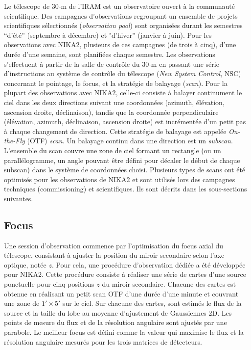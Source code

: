 Le télescope de 30-m de l'IRAM est un observatoire ouvert à la
communauté scientifique. Des campagnes d'observations regroupant un
ensemble de projets scientifiques sélectionnés (\emph{observation
  pool}) sont organisées durant les semestres ``d'été''
(septembre à décembre) et "d'hiver'' (janvier à juin). Pour les
observations avec NIKA2, plusieurs de ces campagnes (de trois à cinq),
d'une durée d'une semaine, sont planifiées chaque semestre. Les
observations s'effectuent à partir de la salle de contrôle du 30-m en
passant une série d'instructions au système de contrôle du télescope
(\emph{New System Control}, NSC) concernant le pointage, le focus, et
la stratégie de balayage (\emph{scan}).
Pour la plupart des observations avec NIKA2, celle-ci
consiste à balayer continument le ciel dans les deux directions
suivant une coordonnées (azimuth, élévation, ascension droite,
déclinaison), tandis que la coordonnée perpendiculaire (élévation, azimuth,
déclinaison, ascension droite) est incrémentée d'un petit pas à chaque
changement de direction. Cette stratégie de balayage est appelée
\emph{On-the-Fly} (OTF) \emph{scan}. Un balayage continu dans une
direction est un \emph{subscan}. L'ensemble du scan couvre une zone de
ciel formant un rectangle (ou un parallélogramme, un angle pouvant
être défini pour décaler le début de chaque subscan) dans le système
de coordonnées choisi. Plusieurs types de scans ont été optimisés pour les
observations de NIKA2 et sont utilisés lors des
campagnes techniques (commissioning) et scientifiques. Ils sont
décrits dans les sous-sections suivantes.

\subsection{Focus}
\label{se:focus}

Une session d'observation commence par l'optimisation du focus axial
du télescope, consistant à ajuster la position du miroir secondaire
selon l'axe optique, notée $z$. Pour cela, une procédure d'observation
dédiée a été développée pour NIKA2. Cette procédure consiste à
réaliser une série de cartes d'une source ponctuelle pour cinq
positions $z$ du miroir secondaire. Chacune des cartes est obtenue en
réalisant un petit scan OTF d'une durée d'une minute et couvrant une
zone de $1' \times 5'$ sur le ciel. Sur chacune des cartes, sont estimés
le flux de la source et la taille du lobe au moyenne d'ajustement de
Gaussiennes 2D. Les points de mesure du flux et de la résolution
angulaire sont ajustés par une parabole. Le meilleur focus est défini
comme la valeur qui maximise le flux et la résolution angulaire
mesurés pour les trois matrices de détecteurs.

